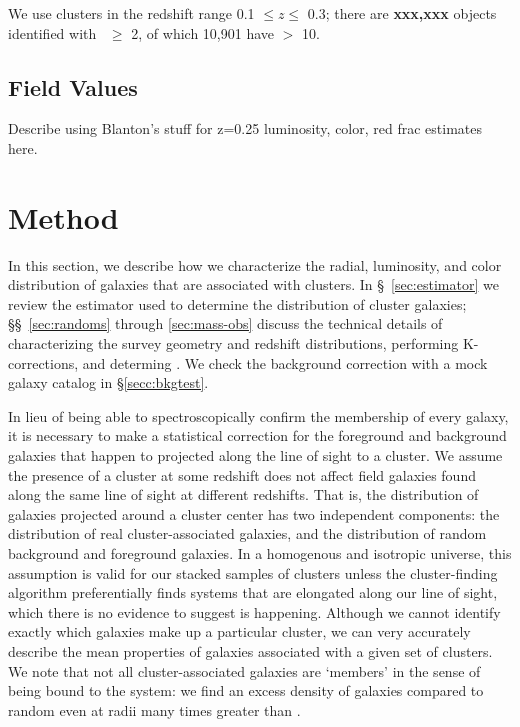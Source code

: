 \documentclass{emulateapj}
\begin{document}
We use clusters in the redshift range 0.1 $\le z \le$ 0.3; there are
{\bf xxx,xxx} objects identified with \Ntwo\ $\ge$ 2, of which 10,901 have
\Ntwo $>$ 10.

\subsection{Field Values}
Describe using Blanton's stuff for z=0.25 luminosity, color, red frac estimates here. 


\section{Method} \label{sec:methods} In this section, we describe how
we characterize the radial, luminosity, and color distribution of
galaxies that are associated with clusters. In \S\
\ref{sec:estimator} we review the estimator used to determine the
distribution of cluster galaxies; \S\S\ \ref{sec:randoms} through
\ref{sec:mass-obs} discuss the technical details of characterizing the
survey geometry and redshift distributions, performing
K-corrections, and determing \rtwo. We check the background correction with a mock galaxy catalog in \S \ref{secc:bkgtest}.

In lieu of being able to spectroscopically confirm the membership of
every galaxy, it is necessary to make a statistical correction for the
foreground and background galaxies that happen to projected along the
line of sight to a cluster. We assume the presence
of a cluster at some redshift does not affect field galaxies found
along the same line of sight at different redshifts. That is, the distribution of galaxies
projected around a cluster center has two independent components: the
distribution of real cluster-associated galaxies, and the distribution of random
background and foreground galaxies. In a homogenous and isotropic universe, this assumption is valid for our stacked samples of clusters unless the cluster-finding algorithm preferentially finds systems that are elongated along our line of sight, which there is no evidence to suggest is happening. Although we cannot identify exactly which galaxies
make up a particular cluster, we can very accurately describe the mean
properties of galaxies associated with a given set of clusters. We note that not all cluster-associated galaxies are `members' in the sense of being bound to the system: we find an excess density of galaxies compared to random even at radii many times greater than \rtwo.
\end{document}
